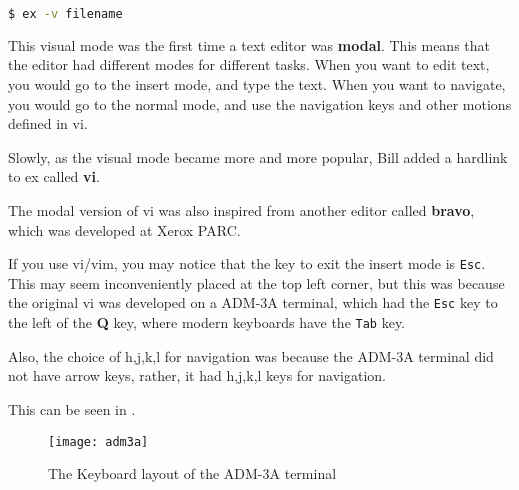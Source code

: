 \begin{lstlisting}[language=bash]
$ ex -v filename
\end{lstlisting}

This visual mode was the first time a text editor
was \textbf{modal}.
This means that the editor had different modes for different tasks.
When you want to edit text, you would go to the insert mode,
and type the text.
When you want to navigate, you would go to the normal mode,
and use the navigation keys and other motions defined in vi.

Slowly, as the visual mode became more and more popular,
Bill added a hardlink to ex called \textbf{vi}.

The modal version of vi was also inspired from another
editor called \textbf{bravo}, which was developed at Xerox PARC.

If you use vi/vim, you may notice that the key to
exit the insert mode is \texttt{Esc}.
This may seem inconveniently placed at the top left corner,
but this was because the original vi was developed on a
ADM-3A terminal, which had the \texttt{Esc} key to the left
of the \textbf{Q} key, where modern keyboards have the \texttt{Tab} key.

Also, the choice of h,j,k,l for navigation was because
the ADM-3A terminal did not have arrow keys,
rather, it had h,j,k,l keys for navigation.

This can be seen in .

\begin{figure}[h!]
  \texttt{[image: adm3a]}
  \caption{The Keyboard layout of the ADM-3A terminal}
\end{figure}



